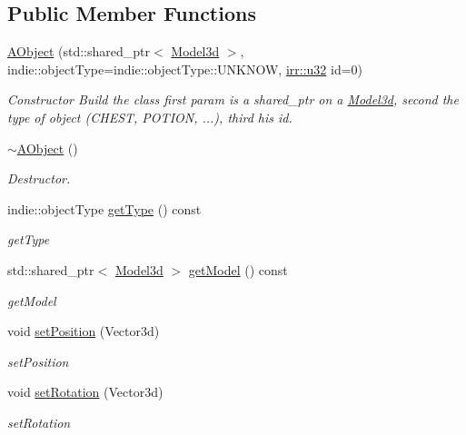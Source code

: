\subsection*{Public Member Functions}
\begin{DoxyCompactItemize}
\item 
\mbox{\label{classAObject_a12a7789fca6342e9ff5c52c7cfd465d1}} 
\hyperlink{classAObject_a12a7789fca6342e9ff5c52c7cfd465d1}{A\+Object} (std\+::shared\+\_\+ptr$<$ \hyperlink{classModel3d}{Model3d} $>$, indie\+::object\+Type=indie\+::object\+Type\+::\+U\+N\+K\+N\+OW, \hyperlink{namespaceirr_a0416a53257075833e7002efd0a18e804}{irr\+::u32} id=0)
\begin{DoxyCompactList}\small\item\em Constructor Build the class first param is a shared\+\_\+ptr on a \hyperlink{classModel3d}{Model3d}, second the type of object (C\+H\+E\+ST, P\+O\+T\+I\+ON, ...), third his id. \end{DoxyCompactList}\item 
\hyperlink{classAObject_ac17f3a1944792c280a3cbd83d839bc4e}{$\sim$\+A\+Object} ()
\begin{DoxyCompactList}\small\item\em Destructor. \end{DoxyCompactList}\item 
indie\+::object\+Type \hyperlink{classAObject_afcbaa047c0d02ca29b76875157a1eb1e}{get\+Type} () const
\begin{DoxyCompactList}\small\item\em get\+Type \end{DoxyCompactList}\item 
std\+::shared\+\_\+ptr$<$ \hyperlink{classModel3d}{Model3d} $>$ \hyperlink{classAObject_a3ffaa331c1842c5bf782c9a0343474bc}{get\+Model} () const
\begin{DoxyCompactList}\small\item\em get\+Model \end{DoxyCompactList}\item 
void \hyperlink{classAObject_ab4a2dc3dad1a54ff80d59c42a51479fb}{set\+Position} (Vector3d)
\begin{DoxyCompactList}\small\item\em set\+Position \end{DoxyCompactList}\item 
void \hyperlink{classAObject_a38ba628dcec6be910ce9d3c9f0de0de7}{set\+Rotation} (Vector3d)
\begin{DoxyCompactList}\small\item\em set\+Rotation \end{DoxyCompactList}\item 

\end{DoxyCompactItemize}
